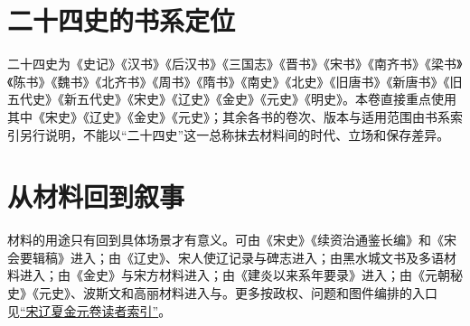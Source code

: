 \section{二十四史的书系定位}

二十四史为《史记》《汉书》《后汉书》《三国志》《晋书》《宋书》《南齐书》《梁书》《陈书》《魏书》《北齐书》《周书》《隋书》《南史》《北史》《旧唐书》《新唐书》《旧五代史》《新五代史》《宋史》《辽史》《金史》《元史》《明史》。本卷直接重点使用其中《宋史》《辽史》《金史》《元史》；其余各书的卷次、版本与适用范围由书系索引另行说明，不能以“二十四史”这一总称抹去材料间的时代、立场和保存差异。

\section{从材料回到叙事}

材料的用途只有回到具体场景才有意义。可由《宋史》《续资治通鉴长编》和《宋会要辑稿》进入；由《辽史》、宋人使辽记录与碑志进入；由黑水城文书及多语材料进入；由《金史》与宋方材料进入；由《建炎以来系年要录》进入；由《元朝秘史》《元史》、波斯文和高丽材料进入与。更多按政权、问题和图件编排的入口见\hyperref[app:index]{“宋辽夏金元卷读者索引”}。
